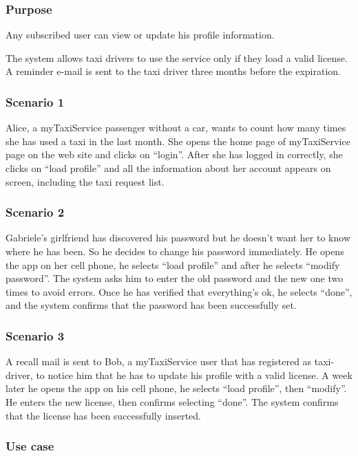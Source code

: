 \label{user-profile}
\subsubsection{Purpose}
Any subscribed user can view or update his profile information. 

The system allows taxi drivers to use the service only if they load a valid license. A reminder e-mail is sent to the taxi driver three months before the expiration. 


\subsubsection{Scenario 1}
Alice, a myTaxiService passenger without a car, wants to count how many times she has used a taxi in the last month.
She opens the home page of myTaxiService page on the web site and clicks on ``login''. 
After she has logged in correctly, she clicks on ``load profile'' and all the information about her account appears on screen, including the taxi request list. 

\subsubsection{Scenario 2}
Gabriele's girlfriend has discovered his password but he doesn't want her to know where he has been. So he decides to change his password immediately. He opens the app on her cell phone, he selects ``load profile'' and after he selects ``modify password''. The system asks him to enter the old password and the new one two times to avoid errors. Once he has verified that everything's ok, he selects ``done'', and the system confirms that the password has been successfully set.

\subsubsection{Scenario 3}
A recall mail is sent to Bob, a myTaxiService user that has registered as taxi-driver, to notice him that he has to update his profile with a valid license. A week later he opens the app on his cell phone, he selects ``load profile'', then ``modify''. He enters the new license, then confirms selecting ``done''. The system confirms that the license has been successfully inserted.



\subsubsection{Use case}

